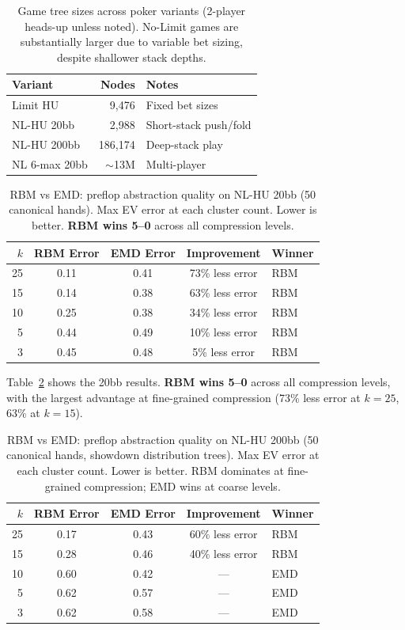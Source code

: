 \documentclass[11pt]{article}
\begin{document}
\begin{table}[t]
\centering
\caption{Game tree sizes across poker variants (2-player heads-up unless
noted). No-Limit games are substantially larger due to variable bet
sizing, despite shallower stack depths.}
\label{tab:tree-sizes}
\begin{tabular}{lrl}
\toprule
Variant & Nodes & Notes \\
\midrule
Limit HU & 9{,}476 & Fixed bet sizes \\
NL-HU 20bb & 2{,}988 & Short-stack push/fold \\
NL-HU 200bb & 186{,}174 & Deep-stack play \\
NL 6-max 20bb & ${\sim}$13M & Multi-player \\
\bottomrule
\end{tabular}
\end{table}

\begin{table}[t]
\centering
\caption{RBM vs EMD: preflop abstraction quality on NL-HU 20bb
(50 canonical hands). Max EV error at each cluster count. Lower is
better. \textbf{RBM wins 5--0} across all compression levels.}
\label{tab:nl-preflop}
\begin{tabular}{rcccl}
\toprule
$k$ & RBM Error & EMD Error & Improvement & Winner \\
\midrule
25 & 0.11 & 0.41 & 73\% less error & RBM \\
15 & 0.14 & 0.38 & 63\% less error & RBM \\
10 & 0.25 & 0.38 & 34\% less error & RBM \\
 5 & 0.44 & 0.49 & 10\% less error & RBM \\
 3 & 0.45 & 0.48 & 5\% less error & RBM \\
\bottomrule
\end{tabular}
\end{table}

Table~\ref{tab:nl-preflop} shows the 20bb results. \textbf{RBM wins
5--0} across all compression levels, with the largest advantage at
fine-grained compression (73\% less error at $k{=}25$, 63\% at
$k{=}15$).

\begin{table}[t]
\centering
\caption{RBM vs EMD: preflop abstraction quality on NL-HU 200bb
(50 canonical hands, showdown distribution trees). Max EV error at each
cluster count. Lower is better. RBM dominates at fine-grained
compression; EMD wins at coarse levels.}
\label{tab:nl-200bb-preflop}
\begin{tabular}{rcccl}
\toprule
$k$ & RBM Error & EMD Error & Improvement & Winner \\
\midrule
25 & 0.17 & 0.43 & 60\% less error & RBM \\
15 & 0.28 & 0.46 & 40\% less error & RBM \\
10 & 0.60 & 0.42 & --- & EMD \\
 5 & 0.62 & 0.57 & --- & EMD \\
 3 & 0.62 & 0.58 & --- & EMD \\
\bottomrule
\end{tabular}
\end{table}
\end{document}
